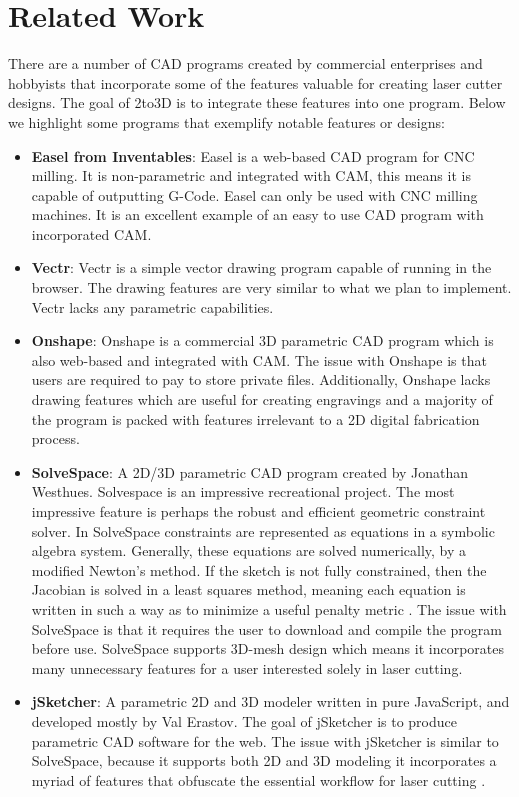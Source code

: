 
\section{Related Work}

There are a number of CAD programs created by commercial enterprises and hobbyists that incorporate some of the features valuable for creating laser cutter designs. The goal of 2to3D is to integrate these features into one program. Below we highlight some programs that exemplify notable features or designs:

\begin{itemize}
  \item \textbf{Easel from Inventables}: Easel is a web-based CAD program for CNC milling. It is non-parametric and integrated with CAM, this means it is capable of outputting G-Code. Easel can only be used with CNC milling machines. It is an excellent example of an easy to use CAD program with incorporated CAM.
  \item \textbf{Vectr}: Vectr is a simple vector drawing program capable of running in the browser. The drawing features are very similar to what we plan to implement. Vectr lacks any parametric capabilities.
  \item \textbf{Onshape}: Onshape is a commercial 3D parametric CAD program which is also web-based and integrated with CAM. The issue with Onshape is that users are required to pay to store private files. Additionally, Onshape lacks drawing features which are useful for creating engravings and a majority of the program is packed with features irrelevant to a 2D digital fabrication process.
  \item \textbf{SolveSpace}: A 2D/3D parametric CAD program created by Jonathan Westhues. Solvespace is an impressive recreational project. The most impressive feature is perhaps the robust and efficient geometric constraint solver. In SolveSpace constraints are represented as equations in a symbolic algebra system. Generally, these equations are solved numerically, by a modified Newton's method. If the sketch is not fully constrained, then the Jacobian is solved in a least squares method, meaning each equation is written in such a way as to minimize a useful penalty metric \cite{solvespace} \cite{solvespace2}. The issue with SolveSpace is that it requires the user to download and compile the program before use. SolveSpace supports 3D-mesh design which means it incorporates many unnecessary features for a user interested solely in laser cutting.
  \item \textbf{jSketcher}: A parametric 2D and 3D modeler written in pure JavaScript, and developed mostly by Val Erastov. The goal of jSketcher is to produce parametric CAD software for the web. The issue with jSketcher is similar to SolveSpace, because it supports both 2D and 3D modeling it incorporates a myriad of features that obfuscate the essential workflow for laser cutting \cite{jsketcher}.
\end{itemize}

